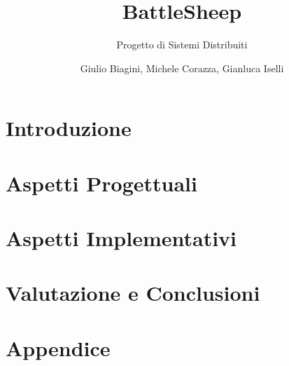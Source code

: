 \documentclass[a4paper,10pt]{scrartcl}
\begin{document}
\title{BattleSheep}
\subtitle{Progetto di Sistemi Distribuiti}
\author{Giulio Biagini, Michele Corazza, Gianluca Iselli}

\maketitle

\begin{abstract}

\end{abstract}

\section{Introduzione}


\section{Aspetti Progettuali}


\section{Aspetti Implementativi}





\section{Valutazione e Conclusioni}


\newpage

\section{Appendice}
\end{document}
